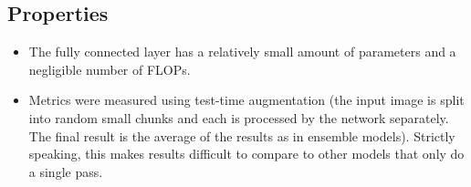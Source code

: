\subsection{Properties}

\begin{itemize}
    \item The fully connected layer has a relatively small amount of parameters and a negligible number of FLOPs.
    \item Metrics were measured using test-time augmentation 
        (the input image is split into random small chunks and each is processed by the network separately. The final result is the average of the results as in ensemble models).
        Strictly speaking, this makes results difficult to compare to other models that only do a single pass.
\end{itemize}

